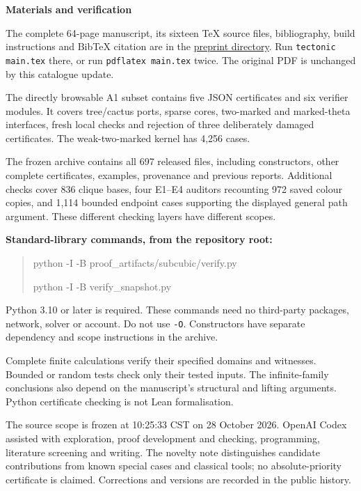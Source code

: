 \documentclass[11pt,a4paper]{article}
\newcommand{\entry}[2]{\par\vspace{4pt}{\large\bfseries #1}\par #2\par}
\begin{document}
{\LARGE\bfseries Materials and verification}\par
\entry{Read and build}{The complete 64-page manuscript, its sixteen TeX
source files, bibliography, build instructions and BibTeX citation are in
the \href{https://github.com/KevinMaSAI/doubled-graphs-local-irregularity/tree/main/preprints/Locally-Irregular-Two-Edge-Colourings-of-Doubled-Graphs-October-28-2026}{preprint directory}.
Run \texttt{tectonic main.tex} there, or run \texttt{pdflatex main.tex}
twice. The original PDF is unchanged by this catalogue update.}

\entry{Complete finite proof data}{The directly browsable A1 subset
contains five JSON certificates and six verifier modules. It covers
tree/cactus ports, sparse cores, two-marked and marked-theta interfaces,
fresh local checks and rejection of three deliberately damaged
certificates. The weak-two-marked kernel has 4,256 cases.}

\entry{The complete snapshot}{The frozen archive contains all 697
released files, including constructors, other complete certificates,
examples, provenance and previous reports. Additional checks cover 836
clique bases, four E1--E4 auditors recounting 972 saved colour copies,
and 1,114 bounded endpoint cases supporting the displayed general path
argument. These different checking layers have different scopes.}

\textbf{Standard-library commands, from the repository root:}
\begin{quote}\ttfamily\small
python -I -B proof\_artifacts/subcubic/verify.py\par
python -I -B verify\_snapshot.py
\end{quote}
Python 3.10 or later is required. These commands need no third-party
packages, network, solver or account. Do not use \texttt{-O}. Constructors
have separate dependency and scope instructions in the archive.

\entry{What the checks mean}{Complete finite calculations verify their
specified domains and witnesses. Bounded or random tests check only
their tested inputs. The infinite-family conclusions also depend on
the manuscript's structural and lifting arguments. Python certificate
checking is not Lean formalisation.}

\entry{Provenance, novelty and revisions}{The source scope is frozen at
10:25:33 CST on 28 October 2026. OpenAI Codex assisted with exploration,
proof development and checking, programming, literature screening and
writing. The novelty note distinguishes candidate contributions from
known special cases and classical tools; no absolute-priority certificate
is claimed. Corrections and versions are recorded in the public history.}
\end{document}
